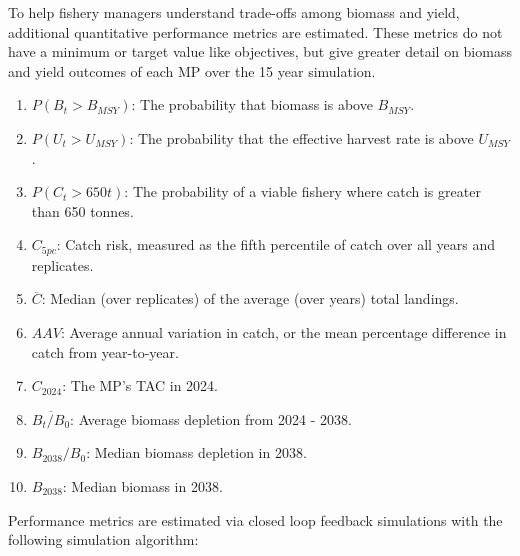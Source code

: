 \documentclass[11pt]{book}
\begin{document}
To help fishery managers understand trade-offs among biomass and yield, additional quantitative performance metrics are estimated. These metrics do not have a minimum or target value like objectives, but give greater detail on biomass and yield outcomes of each MP over the 15 year simulation.
\begin{enumerate}
\def\labelenumi{\arabic{enumi}.}
\item
  \(P(B_t > B_{MSY})\): The probability that biomass is above \(B_{MSY}\).
\item
  \(P(U_t > U_{MSY})\): The probability that the effective harvest rate is above \(U_{MSY}\).
\item
  \(P(C_t > 650 t)\): The probability of a viable fishery where catch is greater than 650 tonnes.
\item
  \(C_{5pc}\): Catch risk, measured as the fifth percentile of catch over all years and replicates.
\item
  \(\overline{C}\): Median (over replicates) of the average (over years) total landings.
\item
  \(AAV\): Average annual variation in catch, or the mean percentage difference in catch from year-to-year.
\item
  \(C_{2024}\): The MP's TAC in 2024.
\item
  \(\overline{B_{t}/B_0}\): Average biomass depletion from 2024 - 2038.
\item
  \({B_{2038}/B_0}\): Median biomass depletion in 2038.
\item
  \(B_{2038}\): Median biomass in 2038.
\end{enumerate}
Performance metrics are estimated via closed loop feedback simulations with the following simulation algorithm:
\end{document}
